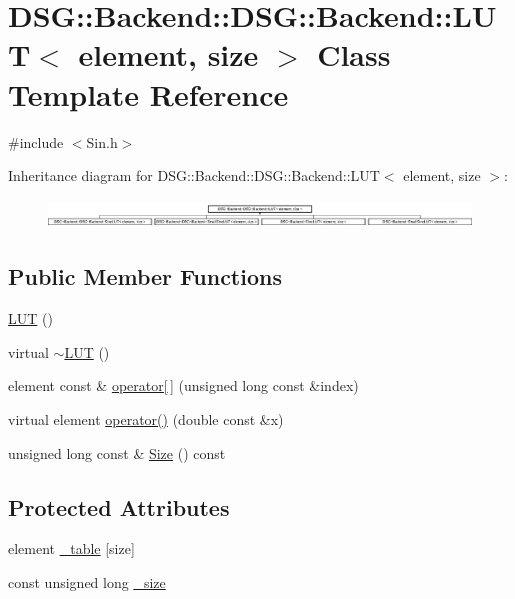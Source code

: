 \hypertarget{classDSG_1_1Backend_1_1DSG_1_1Backend_1_1LUT}{\section{D\+S\+G\+:\+:Backend\+:\+:D\+S\+G\+:\+:Backend\+:\+:L\+U\+T$<$ element, size $>$ Class Template Reference}
\label{classDSG_1_1Backend_1_1DSG_1_1Backend_1_1LUT}
}


{\ttfamily \#include $<$Sin.\+h$>$}

Inheritance diagram for D\+S\+G\+:\+:Backend\+:\+:D\+S\+G\+:\+:Backend\+:\+:L\+U\+T$<$ element, size $>$\+:\begin{figure}[H]
\begin{center}
\leavevmode
\includegraphics[height=0.758808cm]{classDSG_1_1Backend_1_1DSG_1_1Backend_1_1LUT}
\end{center}
\end{figure}
\subsection*{Public Member Functions}
\begin{DoxyCompactItemize}
\item 
\hyperlink{classDSG_1_1Backend_1_1DSG_1_1Backend_1_1LUT_a1072d9fe7abd014fbcf26a695ac00291}{L\+U\+T} ()
\item 
virtual \hyperlink{classDSG_1_1Backend_1_1DSG_1_1Backend_1_1LUT_a85cf256bae4e918775afe7d4f2a07e2a}{$\sim$\+L\+U\+T} ()
\item 
element const \& \hyperlink{classDSG_1_1Backend_1_1DSG_1_1Backend_1_1LUT_acd6db2fa4eba392de1cbb4795f351f8a}{operator\mbox{[}$\,$\mbox{]}} (unsigned long const \&index)
\item 
virtual element \hyperlink{classDSG_1_1Backend_1_1DSG_1_1Backend_1_1LUT_a4cdb48ce3c472160931968739623f8ac}{operator()} (double const \&x)
\item 
unsigned long const \& \hyperlink{classDSG_1_1Backend_1_1DSG_1_1Backend_1_1LUT_a65daa6f46f978a64da1c86089847602d}{Size} () const 
\end{DoxyCompactItemize}
\subsection*{Protected Attributes}
\begin{DoxyCompactItemize}
\item 
element \hyperlink{classDSG_1_1Backend_1_1DSG_1_1Backend_1_1LUT_a427da4b7eccdfe25e3c1889a8c2fdea6}{\+\_\+table} \mbox{[}size\mbox{]}
\item 
const unsigned long \hyperlink{classDSG_1_1Backend_1_1DSG_1_1Backend_1_1LUT_aa48956aa4debf08fdb517cb751d3e01d}{\+\_\+size}
\end{DoxyCompactItemize}


